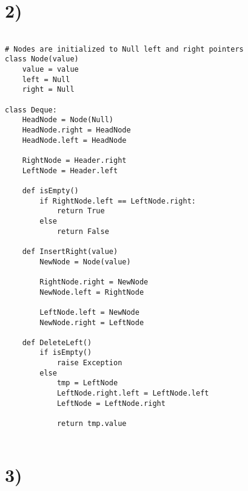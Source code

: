 \documentclass[a4paper,11pt]{article}
\begin{document}
\section*{2)}
\begin{verbatim}

# Nodes are initialized to Null left and right pointers
class Node(value)
    value = value
    left = Null
    right = Null

class Deque:
    HeadNode = Node(Null)
    HeadNode.right = HeadNode
    HeadNode.left = HeadNode
    
    RightNode = Header.right
    LeftNode = Header.left

    def isEmpty()
        if RightNode.left == LeftNode.right:
            return True
        else
            return False

    def InsertRight(value)
        NewNode = Node(value)
       
        RightNode.right = NewNode
        NewNode.left = RightNode
    
        LeftNode.left = NewNode
        NewNode.right = LeftNode
	     
    def DeleteLeft()
        if isEmpty()
            raise Exception
        else
            tmp = LeftNode
            LeftNode.right.left = LeftNode.left
            LeftNode = LeftNode.right
            
            return tmp.value
            
\end{verbatim}


\section*{3)} 
\end{document}

